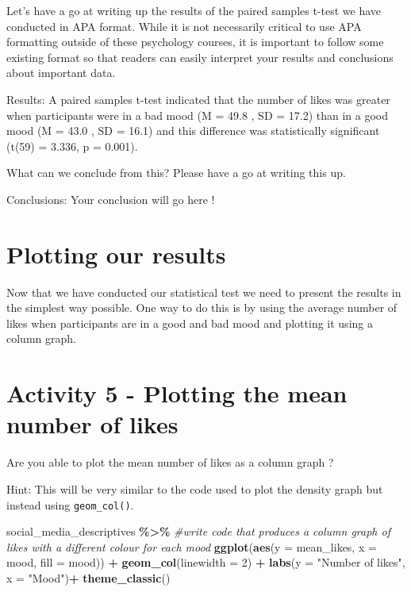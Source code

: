 \documentclass[
]{book}
\newenvironment{Shaded}{\begin{snugshade}}{\end{snugshade}}
\newcommand{\AttributeTok}[1]{\textcolor[rgb]{0.13,0.29,0.53}{#1}}
\newcommand{\CommentTok}[1]{\textcolor[rgb]{0.56,0.35,0.01}{\textit{#1}}}
\newcommand{\DecValTok}[1]{\textcolor[rgb]{0.00,0.00,0.81}{#1}}
\newcommand{\FunctionTok}[1]{\textcolor[rgb]{0.13,0.29,0.53}{\textbf{#1}}}
\newcommand{\NormalTok}[1]{#1}
\newcommand{\SpecialCharTok}[1]{\textcolor[rgb]{0.81,0.36,0.00}{\textbf{#1}}}
\newcommand{\StringTok}[1]{\textcolor[rgb]{0.31,0.60,0.02}{#1}}
\begin{document}
Let's have a go at writing up the results of the paired samples t-test we have conducted in APA format. While it is not necessarily critical to use APA formatting outside of these psychology courses, it is important to follow some existing format so that readers can easily interpret your results and conclusions about important data.

Results: A paired samples t-test indicated that the number of likes was greater when participants were in a bad mood (M = 49.8 , SD = 17.2) than in a good mood (M = 43.0 , SD = 16.1) and this difference was statistically significant (t(59) = 3.336, p = 0.001).

What can we conclude from this? Please have a go at writing this up.

Conclusions: Your conclusion will go here !

\section{Plotting our results}\label{plotting-our-results}

Now that we have conducted our statistical test we need to present the results in the simplest way possible. One way to do this is by using the average number of likes when participants are in a good and bad mood and plotting it using a column graph.

\section{Activity 5 - Plotting the mean number of likes}\label{activity-5---plotting-the-mean-number-of-likes}

Are you able to plot the mean number of likes as a column graph ?

Hint: This will be very similar to the code used to plot the density graph but instead using \texttt{geom\_col()}.

\begin{Shaded}
\begin{Highlighting}[]
\NormalTok{social\_media\_descriptives }\SpecialCharTok{\%\textgreater{}\%}   \CommentTok{\#write code that produces a column graph of likes with a different colour for each mood}
\FunctionTok{ggplot}\NormalTok{(}\FunctionTok{aes}\NormalTok{(}\AttributeTok{y =}\NormalTok{ mean\_likes, }\AttributeTok{x =}\NormalTok{ mood, }\AttributeTok{fill =}\NormalTok{ mood)) }\SpecialCharTok{+}
  \FunctionTok{geom\_col}\NormalTok{(}\AttributeTok{linewidth =} \DecValTok{2}\NormalTok{) }\SpecialCharTok{+}
    \FunctionTok{labs}\NormalTok{(}\AttributeTok{y =} \StringTok{"Number of likes"}\NormalTok{, }\AttributeTok{x =} \StringTok{"Mood"}\NormalTok{)}\SpecialCharTok{+}
  \FunctionTok{theme\_classic}\NormalTok{()}
\end{Highlighting}
\end{Shaded}
\end{document}

